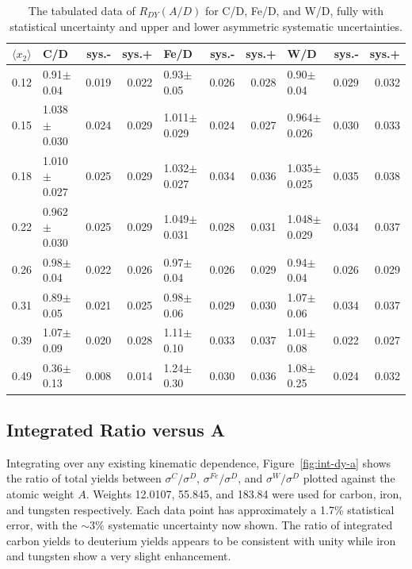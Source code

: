 \begin{table}
	\centering
	\begin{tabular}{@{}llrrlrrlrr@{}}
		\toprule
		$\langle x_2 \rangle$  &     C/D &     sys.- &     sys.+ &           Fe/D &    sys.- &   sys.+ &            W/D &     sys.- &     sys.+ \\
		\midrule
		0.12 &    0.91$\pm$0.04 &  0.019 &  0.022 &    0.93$\pm$0.05 &  0.026 &  0.028 &    0.90$\pm$0.04 &  0.029 &  0.032 \\
		0.15 &  1.038$\pm$0.030 &  0.024 &  0.029 &  1.011$\pm$0.029 &  0.024 &  0.027 &  0.964$\pm$0.026 &  0.030 &  0.033 \\
		0.18 &  1.010$\pm$0.027 &  0.025 &  0.029 &  1.032$\pm$0.027 &  0.034 &  0.036 &  1.035$\pm$0.025 &  0.035 &  0.038 \\
		0.22 &  0.962$\pm$0.030 &  0.025 &  0.029 &  1.049$\pm$0.031 &  0.028 &  0.031 &  1.048$\pm$0.029 &  0.034 &  0.037 \\
		0.26 &   0.98$\pm$0.04 &  0.022 &  0.026 &    0.97$\pm$0.04 &  0.026 &  0.029 &    0.94$\pm$0.04 &  0.026 &  0.029 \\
		0.31 &   0.89$\pm$0.05 &  0.021 &  0.025 &    0.98$\pm$0.06 &  0.029 &  0.030 &    1.07$\pm$0.06 &  0.034 &  0.037 \\
		0.39 &   1.07$\pm$0.09 &  0.020 &  0.028 &    1.11$\pm$0.10 &  0.033 &  0.037 &    1.01$\pm$0.08 &  0.022 &  0.027 \\
		0.49  &   0.36$\pm$0.13 &  0.008 &  0.014 &    1.24$\pm$0.30 &  0.030 &  0.036 &    1.08$\pm$0.25 &  0.024 &  0.032 \\
		\bottomrule
	\end{tabular}
	\caption{The tabulated data of $R_{DY}(A/D)$ for C/D, Fe/D, and W/D, fully with statistical uncertainty and upper and lower asymmetric systematic uncertainties.}
	\label{tab:emc-data-x2}
\end{table}

\subsection{Integrated Ratio versus A}

Integrating over any existing kinematic dependence, Figure~\ref{fig:int-dy-a} shows the ratio of total yields between $\sigma^C/\sigma^D$, $\sigma^{Fe}/\sigma^D$, and $\sigma^W/\sigma^D$ plotted against the atomic weight $A$. Weights 12.0107, 55.845, and 183.84 were used for carbon, iron, and tungsten respectively. Each data point has approximately a 1.7\% statistical error, with the $\sim3\%$ systematic uncertainty now shown. The ratio of integrated carbon yields to deuterium yields appears to be consistent with unity while iron and tungsten show a very slight enhancement.

